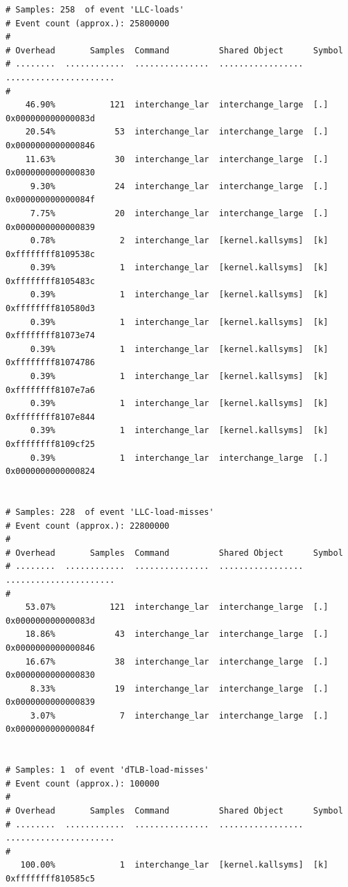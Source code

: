 \documentclass[conference,compsoc]{IEEEtran}
\begin{document}
\begin{lstlisting}
# Samples: 258  of event 'LLC-loads'
# Event count (approx.): 25800000
#
# Overhead       Samples  Command          Shared Object      Symbol                
# ........  ............  ...............  .................  ......................
#
    46.90%           121  interchange_lar  interchange_large  [.] 0x000000000000083d
    20.54%            53  interchange_lar  interchange_large  [.] 0x0000000000000846
    11.63%            30  interchange_lar  interchange_large  [.] 0x0000000000000830
     9.30%            24  interchange_lar  interchange_large  [.] 0x000000000000084f
     7.75%            20  interchange_lar  interchange_large  [.] 0x0000000000000839
     0.78%             2  interchange_lar  [kernel.kallsyms]  [k] 0xffffffff8109538c
     0.39%             1  interchange_lar  [kernel.kallsyms]  [k] 0xffffffff8105483c
     0.39%             1  interchange_lar  [kernel.kallsyms]  [k] 0xffffffff810580d3
     0.39%             1  interchange_lar  [kernel.kallsyms]  [k] 0xffffffff81073e74
     0.39%             1  interchange_lar  [kernel.kallsyms]  [k] 0xffffffff81074786
     0.39%             1  interchange_lar  [kernel.kallsyms]  [k] 0xffffffff8107e7a6
     0.39%             1  interchange_lar  [kernel.kallsyms]  [k] 0xffffffff8107e844
     0.39%             1  interchange_lar  [kernel.kallsyms]  [k] 0xffffffff8109cf25
     0.39%             1  interchange_lar  interchange_large  [.] 0x0000000000000824


# Samples: 228  of event 'LLC-load-misses'
# Event count (approx.): 22800000
#
# Overhead       Samples  Command          Shared Object      Symbol                
# ........  ............  ...............  .................  ......................
#
    53.07%           121  interchange_lar  interchange_large  [.] 0x000000000000083d
    18.86%            43  interchange_lar  interchange_large  [.] 0x0000000000000846
    16.67%            38  interchange_lar  interchange_large  [.] 0x0000000000000830
     8.33%            19  interchange_lar  interchange_large  [.] 0x0000000000000839
     3.07%             7  interchange_lar  interchange_large  [.] 0x000000000000084f


# Samples: 1  of event 'dTLB-load-misses'
# Event count (approx.): 100000
#
# Overhead       Samples  Command          Shared Object      Symbol                
# ........  ............  ...............  .................  ......................
#
   100.00%             1  interchange_lar  [kernel.kallsyms]  [k] 0xffffffff810585c5



\end{lstlisting}
\end{document}
